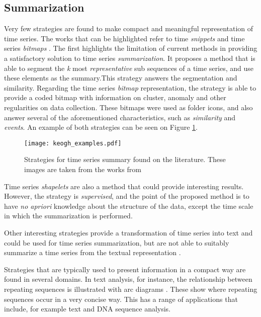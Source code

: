 \subsection{Summarization}

Very few strategies are found to make compact and meaningful representation of time series. The works that can be highlighted refer to time \textit{snippets} and time series \textit{bitmaps} \cite{snippets, bitmap}. The first highlights the limitation of current methods in providing a satisfactory solution to time series \textit{summarization}. It proposes a method that is able to segment the \textit{k} most \textit{representative} sub sequences of a time series, and use these elements as the summary.This strategy answers the segmentation and similarity. Regarding the time series \textit{bitmap} representation, the strategy is able to provide a coded bitmap with information on cluster, anomaly and other regularities on data collection. These bitmaps were used as folder icons, and also answer several of the aforementioned characteristics, such as \textit{similarity} and \textit{events}. An example of both strategies can be seen on Figure \ref{fig:keogh_strat}.

\begin{figure}[t]
    \centering
    \texttt{[image: keogh\_examples.pdf]}
    \caption{Strategies for time series summary found on the literature. These images are taken from the works from \cite{snippets, bitmap}}
    \label{fig:keogh_strat}
\end{figure}

Time series \textit{shapelets} are also a method that could provide interesting results. However, the strategy is \textit{supervised}, and the point of the proposed method is to have \textit{no apriori} knowledge about the structure of the data, except the time scale in which the summarization is performed. 
\par
Other interesting strategies provide a transformation of time series into text and could be used for time series summarization, but are not able to suitably summarize a time series from the textual representation \cite{ssts, sax}.

Strategies that are typically used to present information in a compact way are found in several domains. In text analysis, for instance, the relationship between repeating sequences is illustrated with arc diagrams \cite{bitmap, arcplots}. These show where repeating sequences occur in a very concise way. This has a range of applications that include, for example text and DNA sequence analysis.

